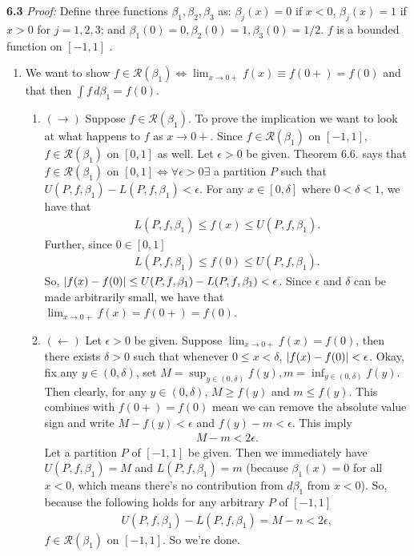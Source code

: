 \documentclass[11pt]{article}
\begin{document}
\noindent \textbf{6.3}
\noindent \textit{Proof:} Define three functions $\beta_1, \beta_2, \beta_3$ as: $\beta_j(x) = 0$ if $x < 0$, $\beta_j (x) = 1$ if $x > 0$ for $j=1,2,3$; and $\beta_1(0) =0 , \beta_2(0) = 1, \beta_3(0) = 1/2$. $f$ is a bounded function on $[-1,1]$ .  
\begin{enumerate}
	\item We want to show $f \in \mathscr{R}(\beta_1) \iff \lim_{x\to 0+}f(x) \equiv f(0+) = f(0)$ and that then $\int f\,d \beta_1 = f(0)$. 
	\begin{enumerate}
		\item $(\rightarrow)$ Suppose $f \in \mathscr{R}(\beta_1)$. To prove the implication we want to look at what happens to $f$ as $x \to 0+$. Since $f \in \mathscr{R}(\beta_1)$ on $[-1,1]$, $f\in \mathscr{R}(\beta_1)$ on $[0,1]$ as well. Let $\epsilon > 0$ be given. Theorem 6.6. says that $f \in \mathscr{R}(\beta_1)$ on $[0,1] \iff \forall \epsilon > 0\exists$ a partition $P$ such that $U(P,f,\beta_1) - L(P,f,\beta_1) < \epsilon$. For any $x \in [0,\delta]$ where $0 < \delta < 1$, we have that 
		\begin{align*}
		L(P,f,\beta_1) \leq f(x) \leq U(P,f,\beta_1).
		\end{align*}
		Further, since $0 \in [0,1]$ 
		\begin{align*}
		L(P,f,\beta_1) \leq f(0) \leq U(P,f,\beta_1).
		\end{align*}
		So, $\abs{f(x) - f(0)} \leq U(P,f,\beta_1) - L(P,f,\beta_1) < \epsilon$. Since $\epsilon$ and $\delta$ can be made arbitrarily small, we have that $\lim_{x\to 0+}f(x) = f(0+) = f(0)$. 
		
		\item $(\leftarrow)$ Let $\epsilon > 0$ be given. Suppose $\lim_{x\to 0+}f(x) = f(0)$, then there exists $\delta > 0$ such that whenever $0 \leq x < \delta$, $\abs{f(x) - f(0)} < \epsilon$. Okay, fix any $y \in (0,\delta)$, set $M = \sup_{y\in (0,\delta)} f(y), m = \inf_{y\in (0,\delta)} f(y)$. Then clearly, for any $y \in (0,\delta)$, $M \geq f(y)$ and $m \leq f(y)$. This combines with $f(0+) = f(0)$ mean we can remove the absolute value sign and write $M - f(y) < \epsilon$ and $f(y) - m < \epsilon$. This imply 
		\begin{align*}
		M - m < 2\epsilon.
		\end{align*}
		Let a partition $P$ of $[-1,1]$ be given. Then we immediately have $U(P,f,\beta_1) = M$ and $L(P,f,\beta_1) = m$ (because $\beta_1(x) = 0$ for all $x<0$, which means there's no contribution from $d\beta_1$ from $x<0$). So, because the following holds for any arbitrary $P$ of $[-1,1]$
		\begin{align*}
		U(P,f,\beta_1) - L(P,f,\beta_1)  = M-n < 2\epsilon,
		\end{align*} 
		$f \in \mathscr{R}(\beta_1)$ on $[-1,1]$. So we're done. 
		

\end{enumerate}
\end{enumerate}
\end{document}
